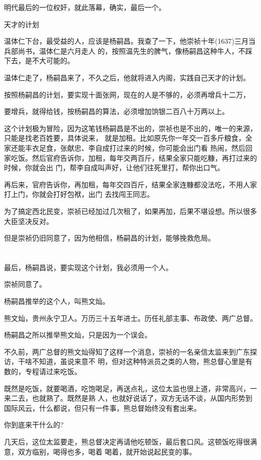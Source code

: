 \documentclass[11pt,a4paper,onecolumn]{article}
\begin{document}
明代最后的一位权奸，就此落幕，确实，最后一个。

天才的计划

温体仁下台，最受益的人，应该是杨嗣昌。我查了一下，他崇祯十年(1637)三月当兵部尚书，温体仁是六月走人
的，按照温先生的脾气，像杨嗣昌这种牛人，不踩下去，是不大可能的。

温体仁走了，杨嗣昌来了，不久之后，他就将进入内阁，实践自己天才的计划。

按照杨嗣昌的计划，要实现十面张网，现在的人是不够的，必须再增兵十二万，

要增兵，就得给钱，按杨嗣昌的算法，必须增加饷银二百八十万两以上。

这个计划极为冒险，因为这笔钱杨嗣昌是不出的，崇祯也是不出的，唯一的来源，只能是找老百姓要，具体说来，
就是加租。比如原先你一年交一百多斤粮食，全家还能丰衣足食，张献忠、李自成打过来的时候，你可能会出门看
热闹，然后回家吃饭。然后官府告诉你，加租，每年交两百斤，结果全家只能吃糠，再打过来的时候，你就会出
门，帮李自成叫声好，让他们往死里打，帮你出口气。

再后来，官府告诉你，再加租，每年交四百斤，结果全家连糠都没法吃，不用人家打上门，你就会打好包袱，出门
去找闯王同志。

为了搞定西北民变，崇祯已经加过几次租了，如果再加，后果不堪设想。所以很多大臣坚决反对。

但是崇祯仍旧同意了，因为他相信，杨嗣昌的计划，能够挽救危局。

\section[\thesection]{}

最后，杨嗣昌说，要实现这个计划，我必须用一个人。

崇祯同意了。

杨嗣昌推举的这个人，叫熊文灿。

熊文灿，贵州永宁卫人。万历三十五年进士。历任礼部主事、布政使、两广总督。

杨嗣昌之所以推举熊文灿，只是因为一个误会。

不久前，两广总督的熊文灿得知了这样一个消息，崇祯的一名亲信太监来到广东探访，干啥不知道，虽说来意不
明，但对这种特派员之类的人物，熊总督心里是有数的，专程请过来吃饭。

既然是吃饭，就要喝酒，吃饱喝足，再送点礼，这位太监也很上道，非常高兴，一来二去，也就熟了。既然是熟
人，也就好说话了，双方无话不谈，从国内形势到国际风云，什么都说，但只有一件事，熊总督始终没有套出来。

你到底来干什么的?

几天后，这位太监要走，熊总督决定再请他吃顿饭，最后套口风。这顿饭吃得很满意，双方临别，喝得也多，喝着
喝着，就开始说起民变的事。
\end{document}
